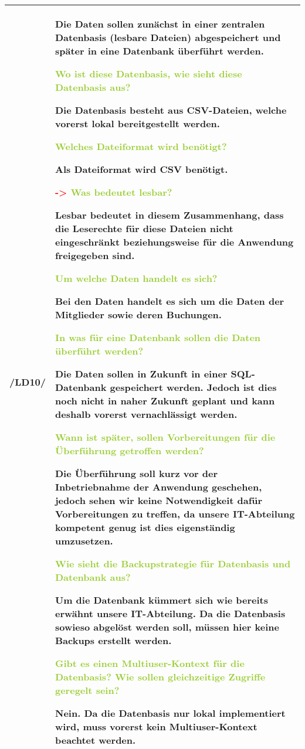 \begin{center}
    \begin{tabular}[ht] {l | p{13cm}}
        \hline
        /LD10/ & Die Daten sollen zunächst in einer zentralen Datenbasis (lesbare Dateien) abgespeichert und später in eine Datenbank überführt werden. 
        
        \textcolor{YellowGreen}{Wo ist diese Datenbasis, wie sieht diese Datenbasis aus?}
        
        \textcolor{NavyBlue}{Die Datenbasis besteht aus CSV-Dateien, welche vorerst lokal bereitgestellt werden.}

        \textcolor{YellowGreen}{Welches Dateiformat wird benötigt?}

        \textcolor{NavyBlue}{Als Dateiformat wird CSV benötigt.}

        \textcolor{Red}{->}
        \textcolor{YellowGreen}{Was bedeutet lesbar?}

        \textcolor{NavyBlue}{Lesbar bedeutet in diesem Zusammenhang, dass die Leserechte für diese Dateien nicht eingeschränkt beziehungsweise für die Anwendung freigegeben sind.}

        \textcolor{YellowGreen}{Um welche Daten handelt es sich?}

        \textcolor{NavyBlue}{Bei den Daten handelt es sich um die Daten der Mitglieder sowie deren Buchungen.}

        \textcolor{YellowGreen}{In was für eine Datenbank sollen die Daten überführt werden?}

        \textcolor{NavyBlue}{Die Daten sollen in Zukunft in einer SQL-Datenbank gespeichert werden. Jedoch ist dies noch nicht in naher Zukunft geplant und kann deshalb vorerst vernachlässigt werden.}

        \textcolor{YellowGreen}{Wann ist später, sollen Vorbereitungen für die Überführung getroffen werden?}

        \textcolor{NavyBlue}{Die Überführung soll kurz vor der Inbetriebnahme der Anwendung geschehen, jedoch sehen wir keine Notwendigkeit dafür Vorbereitungen zu treffen, da unsere IT-Abteilung kompetent genug ist dies eigenständig umzusetzen.}

        \textcolor{YellowGreen}{Wie sieht die Backupstrategie für Datenbasis und Datenbank aus?}

        \textcolor{NavyBlue}{Um die Datenbank kümmert sich wie bereits erwähnt unsere IT-Abteilung. Da die Datenbasis sowieso abgelöst werden soll, müssen hier keine Backups erstellt werden.}

        \textcolor{YellowGreen}{Gibt es einen Multiuser-Kontext für die \grqq{}Datenbasis\grqq{}? Wie sollen gleichzeitige Zugriffe geregelt sein?}

        \textcolor{NavyBlue}{Nein. Da die Datenbasis nur lokal implementiert wird, muss vorerst kein Multiuser-Kontext beachtet werden.} \\
        \hline
        
    \end{tabular}
\end{center}

